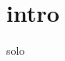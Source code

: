 \documentclass[11pt]{article}
\begin{document}
    
    \makesongtitle
    \section*{intro}
    

%    
    {solo}

%    
\end{document}
